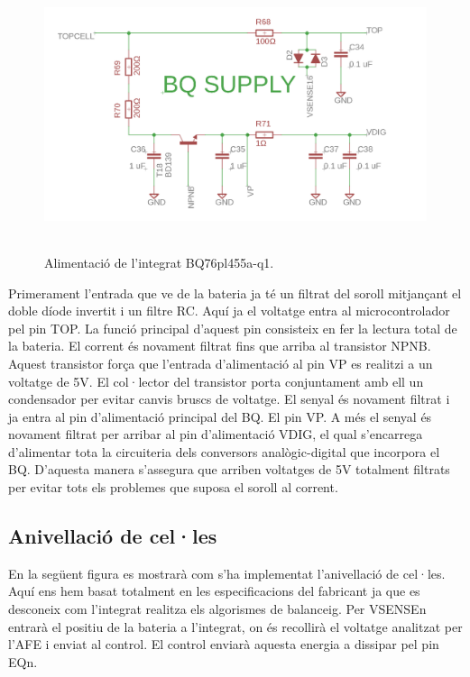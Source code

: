 \begin{figure}[H]
	\centering
    \includegraphics[width=\textwidth, height=8cm] {Prototip/schsupply.png}
    \caption{Alimentació de l'integrat BQ76pl455a-q1.}
\end{figure}

Primerament l'entrada que ve de la bateria ja té un filtrat del soroll \newline mitjançant el doble díode invertit i un filtre RC. Aquí ja el voltatge entra al microcontrolador pel pin TOP. La funció principal d'aquest pin consisteix en fer la lectura total de la bateria. El corrent és novament filtrat fins que arriba al transistor NPNB. Aquest transistor força que l'entrada d'alimentació al pin VP es realitzi a un voltatge de 5V. El col·lector del transistor porta conjuntament amb ell un condensador per evitar canvis bruscs de voltatge. El senyal és novament filtrat i ja entra al pin d'alimentació principal del BQ. El pin VP. A més el senyal és novament filtrat per arribar al pin d'alimentació VDIG, el qual s'encarrega d'alimentar tota la circuiteria dels conversors analògic-digital que incorpora el BQ. D'aquesta manera s'assegura que arriben voltatges de 5V totalment filtrats per evitar tots els problemes que suposa el soroll al corrent.

\subsection{Anivellació de cel·les}

En la següent figura es mostrarà com s'ha implementat l'anivellació de cel·les. Aquí ens hem basat totalment en les especificacions del fabricant ja que es desconeix com l'integrat realitza els algorismes de balanceig. Per VSENSEn entrarà el positiu de la bateria a l'integrat, on és recollirà el voltatge analitzat per l'AFE i enviat al control. El control enviarà aquesta energia a dissipar pel pin EQn. 

